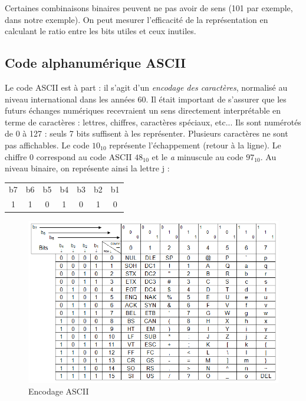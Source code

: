 Certaines combinaisons binaires peuvent ne pas avoir de sens (101 par exemple, dans notre exemple). On peut mesurer l'efficacité de la représentation en calculant le ratio entre les
bits utiles et ceux inutiles.

\subsection{Code alphanumérique ASCII}

Le code ASCII est à part : il s'agit d'un {\it encodage des caractères}, normalisé au niveau international dans les années 60. Il était important de s'assurer que les futurs échanges numériques recevraient un sens directement interprétable en terme de caractères  : lettres, chiffres, caractères spéciaux, etc... Ils sont numérotés de 0 à 127 : seuls 7 bits suffisent à les représenter. Plusieurs caractères ne sont pas affichables. Le code $10_{10}$ représente l'échappement (retour à la ligne). Le chiffre $0$ correspond au code ASCII $48_{10}$ et le {\it a} minuscule au code $97_{10}$.
Au niveau binaire, on représente ainsi la lettre j :
\begin{center}
\begin{tabular}{|ccccccc|}
\hline
b7 & b6 & b5 & b4 & b3 & b2 & b1 \\
1  & 1  & 0  & 1  & 0  & 1  & 0 \\
\hline
\end{tabular}
\end{center}

\begin{figure}
  \centering
  \includegraphics[scale=0.6]{./figures/ASCII.png}
  \caption{Encodage ASCII}
\end{figure}

